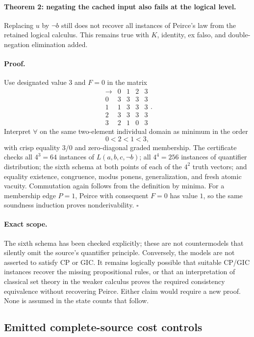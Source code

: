 \paragraph{Theorem 2: negating the cached input also fails at the logical level.}
Replacing $u$ by $\neg b$ still does not recover all instances of Peirce's
law from the retained logical calculus. This remains true with $K$,
identity, ex falso, and double-negation elimination added.

\paragraph{Proof.}
Use designated value $3$ and $F=0$ in the matrix
\[
\begin{array}{c|cccc}
 \to&0&1&2&3\\\hline
 0&3&3&3&3\\
 1&1&3&3&3\\
 2&3&3&3&3\\
 3&2&1&0&3
\end{array}.
\]
Interpret $\forall$ on the same two-element individual domain as minimum
in the order
\[
 0<2<1<3,
\]
with crisp equality $3/0$ and zero-diagonal graded membership. The
certificate checks all $4^3=64$ instances of $L(a,b,c,\neg b)$; all
$4^4=256$ instances of quantifier distribution; the sixth schema at both
points of each of the $4^2$ truth vectors; and equality existence,
congruence, modus ponens, generalization, and fresh atomic vacuity.
Commutation again follows from the definition by minima.
For a membership edge $P=1$, Peirce with consequent $F=0$ has value $1$,
so the same soundness induction proves nonderivability. $\square$

\paragraph{Exact scope.}
The sixth schema has been checked explicitly; these are not countermodels
that silently omit the source's quantifier principle. Conversely, the
models are not asserted to satisfy CP or GIC. It remains logically possible
that suitable CP/GIC instances recover the missing propositional rules,
or that an interpretation of classical set theory in the weaker calculus
proves the required consistency equivalence without recovering Peirce.
Either claim would require a new proof. None is assumed in the state counts
that follow.

\subsection{Emitted complete-source cost controls}

